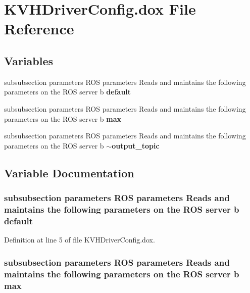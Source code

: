 \section{\-K\-V\-H\-Driver\-Config.\-dox \-File \-Reference}
\label{KVHDriverConfig_8dox}
\subsection*{\-Variables}
\begin{DoxyCompactItemize}
\item 
subsubsection parameters \-R\-O\-S \*
parameters \-Reads and maintains \*
the following parameters on \*
the \-R\-O\-S server b {\bf default}
\item 
subsubsection parameters \-R\-O\-S \*
parameters \-Reads and maintains \*
the following parameters on \*
the \-R\-O\-S server b {\bf max}
\item 
subsubsection parameters \-R\-O\-S \*
parameters \-Reads and maintains \*
the following parameters on \*
the \-R\-O\-S server b {\bf $\sim$output\-\_\-topic}
\end{DoxyCompactItemize}


\subsection{\-Variable \-Documentation}
\subsubsection[{default}]{\setlength{\rightskip}{0pt plus 5cm}subsubsection parameters \-R\-O\-S parameters \-Reads and maintains the following parameters on the \-R\-O\-S server b {\bf default}}\label{KVHDriverConfig_8dox_a94d02332ecf13e7845f06fe8c343e101}


\-Definition at line 5 of file \-K\-V\-H\-Driver\-Config.\-dox.

\subsubsection[{max}]{\setlength{\rightskip}{0pt plus 5cm}subsubsection parameters \-R\-O\-S parameters \-Reads and maintains the following parameters on the \-R\-O\-S server b {\bf max}}\label{KVHDriverConfig_8dox_a55c9de72d9f3630abdf51bfe39c191dd}


